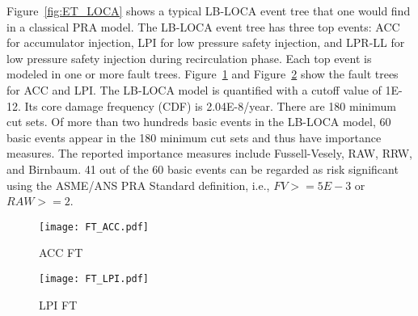 Figure~\ref{fig:ET_LOCA} shows a typical LB-LOCA event tree that one would find in a classical PRA model. 
The LB-LOCA event tree has three top events: ACC for accumulator injection, LPI for 
low pressure safety injection, and LPR-LL for low pressure safety injection during 
recirculation phase. Each top event is modeled in one or more fault trees. 
Figure~\ref{fig:FT_ACC} and Figure~\ref{fig:FT_LPI} show the fault trees for ACC and LPI. 
The LB-LOCA model is quantified with a cutoff value of 1E-12. Its core damage frequency 
(CDF) is 2.04E-8/year. There are 180 minimum cut sets. Of more than two hundreds basic 
events in the LB-LOCA model, 60 basic events appear in the 180 minimum cut sets and thus 
have importance measures. The reported importance measures include Fussell-Vesely, RAW, 
RRW, and Birnbaum. 41 out of the 60 basic events can be regarded as risk significant using the 
ASME/ANS PRA Standard definition, i.e., $FV >= 5E-3$ or $RAW >= 2$. 

\begin{figure}
    \centering
    \texttt{[image: FT\_ACC.pdf]}
    \caption{ACC FT}
    \label{fig:FT_ACC}
\end{figure} 

\begin{figure}
    \centering
    \texttt{[image: FT\_LPI.pdf]}
    \caption{LPI FT}
    \label{fig:FT_LPI}
\end{figure} 

